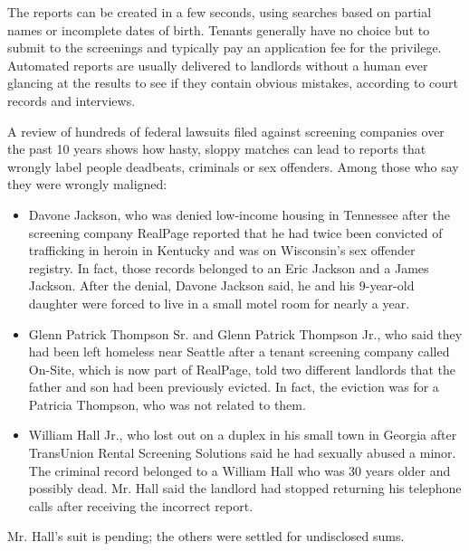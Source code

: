 The reports can be created in a few seconds, using searches based on
partial names or incomplete dates of birth. Tenants generally have no
choice but to submit to the screenings and typically pay an application
fee for the privilege. Automated reports are usually delivered to
landlords without a human ever glancing at the results to see if they
contain obvious mistakes, according to court records and interviews.

A review of hundreds of federal lawsuits filed against screening
companies over the past 10 years shows how hasty, sloppy matches can
lead to reports that wrongly label people deadbeats, criminals or sex
offenders. Among those who say they were wrongly maligned:

\begin{itemize}
\tightlist
\item
  Davone Jackson, who was denied low-income housing in Tennessee after
  the screening company RealPage reported that he had twice been
  convicted of trafficking in heroin in Kentucky and was on Wisconsin's
  sex offender registry. In fact, those records belonged to an Eric
  Jackson and a James Jackson. After the denial, Davone Jackson said, he
  and his 9-year-old daughter were forced to live in a small motel room
  for nearly a year.
\end{itemize}

\begin{itemize}
\tightlist
\item
  Glenn Patrick Thompson Sr. and Glenn Patrick Thompson Jr., who said
  they had been left homeless near Seattle after a tenant screening
  company called On-Site, which is now part of RealPage, told two
  different landlords that the father and son had been previously
  evicted. In fact, the eviction was for a Patricia Thompson, who was
  not related to them.
\end{itemize}

\begin{itemize}
\tightlist
\item
  William Hall Jr., who lost out on a duplex in his small town in
  Georgia after TransUnion Rental Screening Solutions said he had
  sexually abused a minor. The criminal record belonged to a William
  Hall who was 30 years older and possibly dead. Mr. Hall said the
  landlord had stopped returning his telephone calls after receiving the
  incorrect report.
\end{itemize}

Mr. Hall's suit is pending; the others were settled for undisclosed
sums.

